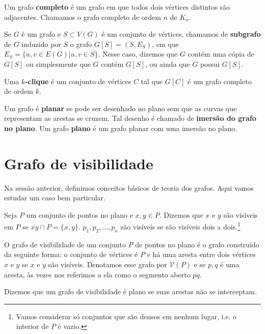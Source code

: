 \documentclass[a4paper]{book}
\begin{document}
Um grafo \textbf{completo} é um grafo em que todos dois vértices distintos são adjacentes. Chamamos o grafo completo de ordem $n$ de $K_n$.

Se $G$ é um grafo e  $S\subset V(G)$ é um conjunto de vértices, chamamos de \textbf{subgrafo} de $G$ induzido por $S$ o grafo $G[S]=(S,E_S)$, em que $E_S=\{{u,v}\in E(G)|u,v\in S\}$. Nesse caso, dizemos que $G$ contém uma cópia de $G[S]$ ou simplesmente que $G$ contém $G[S]$, ou ainda que $G$ possui $G[S]$.

Uma \textbf{$k$-clique} é um conjunto de vértices $C$ tal que $G[C]$ é um grafo completo de ordem $k$.

Um grafo é \textbf{planar} se pode ser desenhado no plano sem que as curvas que representam as arestas se cruzem. Tal desenho é chamado de \textbf{imersão do grafo no plano}. Um grafo \textbf{plano} é um grafo planar com uma imersão no plano.

\section{Grafo de visibilidade}
Na sessão anterior, definimos conceitos básicos de teoria dos grafos. Aqui vamos estudar um caso bem particular.

Seja $P$ um conjunto de pontos no plano e $x,y\in P$. Dizemos que $x$ e $y$ são visíveis em $P$ se $\overline{xy}\cap P =\{x,y\}$. $p_1, p_2, ..., p_n$ são visíveis se são visíveis dois a dois.\footnote{Vamos considerar só conjuntos que são densos em nenhum lugar, i.e. o interior de $P$ é vazio.}

O grafo de visibilidade de um conjunto $P$ de pontos no plano é o grafo construído da seguinte forma: o conjunto de vértices é $P$ e há uma aresta entre dois vértices $x$ e $y$ se $x$ e $y$ são visíveis. Denotamos esse grafo por $\mathcal V(P)$ e se ${p,q}$ é uma aresta, às vezes nos referimos a ela como o segmento aberto $\overline{pq}$.

Dizemos que um grafo de visibilidade é plano se suas arestas não se interceptam.
\end{document}
